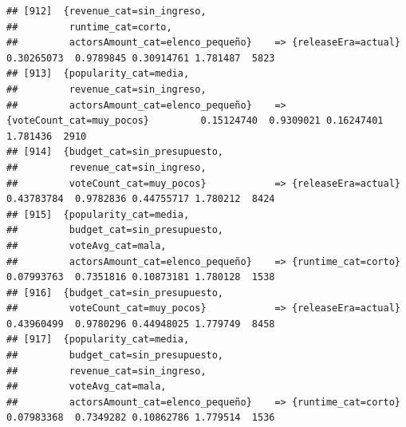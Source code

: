 \documentclass[
]{article}
\begin{document}
\begin{verbatim}
## [912]  {revenue_cat=sin_ingreso,                                                                                                
##         runtime_cat=corto,                                                                                                      
##         actorsAmount_cat=elenco_pequeño}    => {releaseEra=actual}               0.30265073  0.9789845 0.30914761 1.781487  5823
## [913]  {popularity_cat=media,                                                                                                   
##         revenue_cat=sin_ingreso,                                                                                                
##         actorsAmount_cat=elenco_pequeño}    => {voteCount_cat=muy_pocos}         0.15124740  0.9309021 0.16247401 1.781436  2910
## [914]  {budget_cat=sin_presupuesto,                                                                                             
##         revenue_cat=sin_ingreso,                                                                                                
##         voteCount_cat=muy_pocos}            => {releaseEra=actual}               0.43783784  0.9782836 0.44755717 1.780212  8424
## [915]  {popularity_cat=media,                                                                                                   
##         budget_cat=sin_presupuesto,                                                                                             
##         voteAvg_cat=mala,                                                                                                       
##         actorsAmount_cat=elenco_pequeño}    => {runtime_cat=corto}               0.07993763  0.7351816 0.10873181 1.780128  1538
## [916]  {budget_cat=sin_presupuesto,                                                                                             
##         voteCount_cat=muy_pocos}            => {releaseEra=actual}               0.43960499  0.9780296 0.44948025 1.779749  8458
## [917]  {popularity_cat=media,                                                                                                   
##         budget_cat=sin_presupuesto,                                                                                             
##         revenue_cat=sin_ingreso,                                                                                                
##         voteAvg_cat=mala,                                                                                                       
##         actorsAmount_cat=elenco_pequeño}    => {runtime_cat=corto}               0.07983368  0.7349282 0.10862786 1.779514  1536

\end{verbatim}
\end{document}
